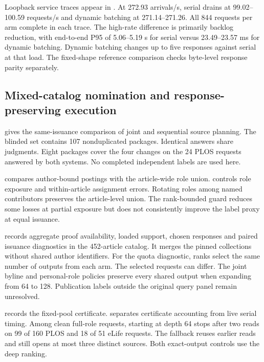 Loopback service traces appear in . At 272.93 arrivals/s, serial drains at 99.02--100.59 requests/s and dynamic batching at 271.14--271.26. All 844 requests per arm complete in each trace. The high-rate difference is primarily backlog reduction, with end-to-end P95 of 5.06--5.19 s for serial versus 23.49--23.57 ms for dynamic batching. Dynamic batching changes up to five responses against serial at that load. The fixed-shape reference comparison checks byte-level response parity separately.

\subsection{Mixed-catalog nomination and response-preserving execution}
 gives the same-issuance comparison of joint and sequential source planning. The blinded set contains 107 nonduplicated packages. Identical answers share judgments. Eight packages cover the four changes on the 24 PLOS requests answered by both systems. No completed independent labels are used here.

 compares author-bound postings with the article-wide role union.  controls role exposure and within-article assignment errors. Rotating roles among named contributors preserves the article-level union. The rank-bounded guard reduces some losses at partial exposure but does not consistently improve the label proxy at equal issuance.

 records aggregate proof availability, loaded support, chosen responses and paired issuance diagnostics in the 452-article catalog. It merges the pinned collections without shared author identifiers. For the quota diagnostic, ranks select the same number of outputs from each arm. The selected requests can differ. The joint byline and personal-role policies preserve every shared output when expanding from 64 to 128. Publication labels outside the original query panel remain unresolved.

 records the fixed-pool certificate.  separates certificate accounting from live serial timing. Among clean full-role requests, starting at depth 64 stops after two reads on 99 of 160 PLOS and 18 of 51 eLife requests. The fallback reuses earlier reads and still opens at most three distinct sources. Both exact-output controls use the deep ranking.

